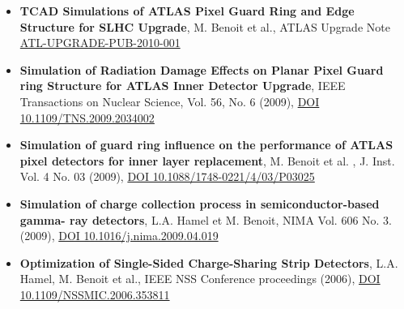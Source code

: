 \begin{itemize}
\item	\textbf{TCAD Simulations of ATLAS Pixel Guard Ring and Edge Structure for SLHC Upgrade}, M. Benoit et al.,  ATLAS Upgrade Note \href{https://cds.cern.ch/record/1233750}{ATL-UPGRADE-PUB-2010-001}\\

\item	\textbf{Simulation of Radiation Damage Effects on Planar Pixel Guard ring Structure for ATLAS Inner Detector Upgrade}, IEEE Transactions on Nuclear Science, Vol. 56, No. 6 (2009), \href{https://ieeexplore.ieee.org/abstract/document/5341399}{DOI 10.1109/TNS.2009.2034002}\\

\item	\textbf{Simulation of guard ring influence on the performance of ATLAS pixel detectors for inner layer replacement}, M. Benoit et al. , J. Inst. Vol. 4 No. 03 (2009),  \href{https://iopscience.iop.org/article/10.1088/1748-0221/4/03/P03025}{DOI 10.1088/1748-0221/4/03/P03025}\\

\item \textbf{Simulation of charge collection process in semiconductor-based gamma- ray detectors}, L.A. Hamel et M. Benoit, NIMA Vol. 606 No. 3. (2009), \href{https://www.sciencedirect.com/science/article/pii/S0168900209007864}{DOI 10.1016/j.nima.2009.04.019} \\

\item	\textbf{Optimization of Single-Sided Charge-Sharing Strip Detectors}, L.A. Hamel, M. Benoit et al., IEEE NSS Conference proceedings (2006), \href{https://ieeexplore.ieee.org/document/4179853}{DOI 10.1109/NSSMIC.2006.353811}


\end{itemize}
